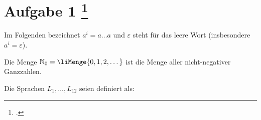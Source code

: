 \documentclass{lehramt-informatik-aufgabe}
\begin{document}
\def\z#1{
  \liZustandsMengenSammlungNr{#1}{
    {
      {0} {0}
      {1} {1}
      {2} {0,3}
      {3} {2}
      {4} {1,4}
      {5} {2,4}
    }
  }
}

\section{Aufgabe 1
\footcite{66115:2021:03}}

Im Folgenden bezeichnet $a^i = a \dots a$ und $\varepsilon$ steht für
das leere Wort (\dh insbesondere $a^i = \varepsilon$).

Die Menge $\mathbb{N}_0 = \liMenge{0,1,2,\dots}$ ist die Menge aller
nicht-negativer Ganzzahlen.

Die Sprachen $L_1, \dots , L_{12}$ seien definiert als:
\end{document}
